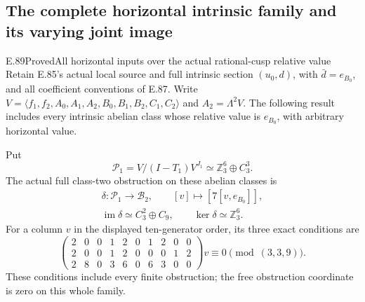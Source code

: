 \subsection{The complete horizontal intrinsic family and its varying joint image}

\begin{statement}{E.89}{Proved}{All horizontal inputs over the actual rational-cusp relative value}
Retain E.85's actual local source and full intrinsic
section $(u_0,d)$, with $\bar d=e_{B_0}$, and all
coefficient conventions of E.87. Write
$V=\langle f_1,f_2,A_0,A_1,A_2,B_0,B_1,B_2,C_1,C_2\rangle$
and $A_2=\Lambda^2V$. The following result includes
every intrinsic abelian class whose relative value
is $e_{B_0}$, with arbitrary horizontal value.

Put
\[
 \mathcal P_1=V/(I-T_1)V^{J_1}
       \simeq\mathbb Z_3^6\oplus C_3^3.
 \tag{E89.1}
\]
The actual full class-two obstruction on these
abelian classes is
\[
 \begin{gathered}
 \delta:\mathcal P_1\longrightarrow\mathcal B_2,
       \qquad[v]\longmapsto[7[v,e_{B_0}]],\\
 \operatorname{im}\delta\simeq C_3^2\oplus C_9,
       \qquad\ker\delta\simeq\mathbb Z_3^6.
 \end{gathered}
 \tag{E89.2}
\]
For a column $v$ in the displayed ten-generator
order, its three exact conditions are
\[
 \begin{pmatrix}
 2&0&0&1&2&0&1&2&0&0\\
 2&0&0&1&2&0&0&0&1&2\\
 2&8&0&3&6&0&6&3&0&0
 \end{pmatrix}v
       \equiv0\pmod{(3,3,9)}.
 \tag{E89.3}
\]
These conditions include every finite obstruction;
the free obstruction coordinate is zero on this
whole family.


\end{statement}

